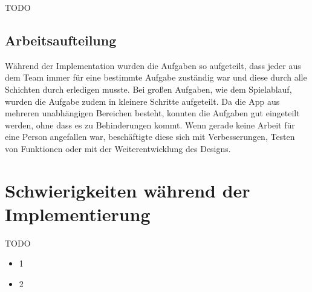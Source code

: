 TODO

\subsection{Arbeitsaufteilung}
\label{sec:implementierung:architektur:arbeitsaufteilung}

Während der Implementation wurden die Aufgaben so aufgeteilt, dass jeder aus dem Team immer für eine bestimmte Aufgabe zuständig war und diese durch alle Schichten durch erledigen musste. Bei großen Aufgaben, wie dem Spielablauf, wurden die Aufgabe zudem in kleinere Schritte aufgeteilt. Da die App aus mehreren unabhängigen Bereichen besteht, konnten die Aufgaben gut eingeteilt werden, ohne dass es zu Behinderungen kommt. Wenn gerade keine Arbeit für eine Person angefallen war, beschäftigte diese sich mit Verbesserungen, Testen von Funktionen oder mit der Weiterentwicklung des Designs.

\section{Schwierigkeiten während der Implementierung}
\label{sec:implementierung:schwierigkeiten}	

TODO

\begin{itemize} 
\item 1
\item 2
\end{itemize}




